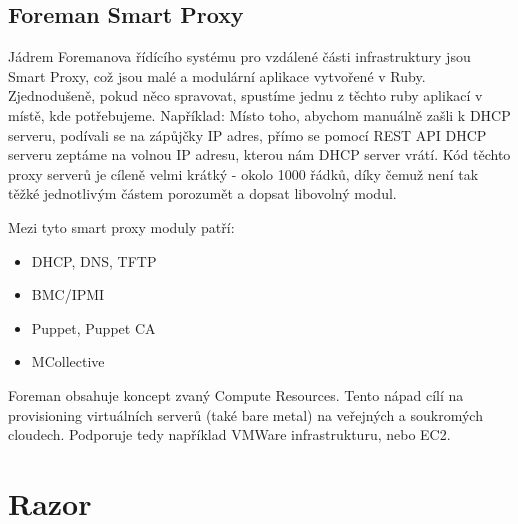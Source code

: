 \documentclass[thesis=B,czech]{FITthesis}[2012/06/26]
\begin{document}
\subsection{Foreman Smart Proxy}

Jádrem Foremanova řídícího systému pro vzdálené části infrastruktury jsou Smart Proxy, což jsou malé a modulární aplikace vytvořené v Ruby. Zjednodušeně, pokud něco spravovat, spustíme jednu z těchto ruby aplikací v místě, kde potřebujeme. Například: Místo toho, abychom manuálně zašli k DHCP serveru, podívali se na zápůjčky IP adres, přímo se pomocí REST API DHCP serveru zeptáme na volnou IP adresu, kterou nám DHCP server vrátí. Kód těchto proxy serverů je cíleně velmi krátký - okolo 1000 řádků, díky čemuž není tak těžké jednotlivým částem porozumět a dopsat libovolný modul. 

Mezi tyto smart proxy moduly patří:
\begin{itemize}

\item DHCP, DNS, TFTP
\item BMC/IPMI
\item Puppet, Puppet CA
\item MCollective
\end{itemize}

Foreman obsahuje koncept zvaný Compute Resources. Tento nápad cílí na provisioning virtuálních serverů (také bare metal) na veřejných a soukromých cloudech. Podporuje tedy například VMWare infrastrukturu, nebo EC2.







\section{Razor}
\end{document}
